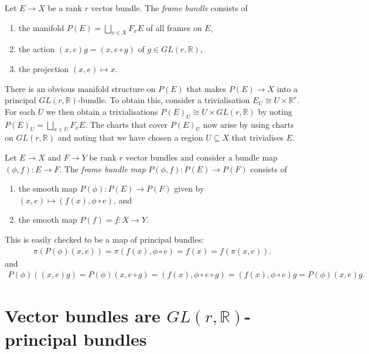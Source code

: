 \documentclass{article}
\begin{document}
\begin{definition}
  Let $E\to X$ be a rank $r$ vector bundle. The \emph{frame bundle} consists of
  \begin{enumerate}
    \item the manifold $P(E)=\bigsqcup_{x\in X} F_x E$ of all frames on
      $E$,
    \item the action $(x,e)g=(x,e\circ g)$ of $g\in GL(r,\mathbb{R})$,
    \item the projection $(x,e)\mapsto x$.
  \end{enumerate}
\end{definition}

There is an obvious manifold structure on $P(E)$ that makes $P(E)\to X$ into a
principal $GL(r,\mathbb{R})$-bundle. To obtain this, consider a trivialisation
$E_U \cong U\times\mathbb{R}^r$. For each $U$ we then obtain a
trivialisations $P(E)_U \cong U\times GL(r,\mathbb{R})$ by noting
$P(E)_{U} = \bigsqcup_{x\in U} F_x E$. The charts that cover $P(E)_{U}$ now
arise by using charts on $GL(r,\mathbb{R})$ and noting that we have chosen a
region $U\subseteq X$ that trivialises $E$.

\begin{definition}
  Let $E\to X$ and $F\to Y$ be rank $r$ vector bundles and
  consider a bundle map $(\phi,f):E\to F$. The \emph{frame bundle
  map} $P(\phi,f):P(E)\to P(F)$ consists of
  \begin{enumerate}
    \item the smooth map $P(\phi):P(E)\to P(F)$ given by
      $(x,e)\mapsto (f(x),\phi\circ e)$, and
    \item the smooth map $P(f)=f:X\to Y$.
  \end{enumerate}
\end{definition}

This is easily checked to be a map of principal bundles:
\begin{align*}
  \pi(P(\phi)(x,e)) = \pi(f(x),\phi\circ e) = f(x) = f(\pi(x,e)).
\end{align*}
and
\begin{align*}
  P(\phi)((x,e)g)
  = P(\phi)(x, e\circ g)
  = (f(x),\phi\circ e\circ g)
  = (f(x),\phi\circ e)g
  = P(\phi)(x,e)g.
\end{align*}

\section{Vector bundles are $GL(r,\mathbb{R})$-principal bundles}
\end{document}
